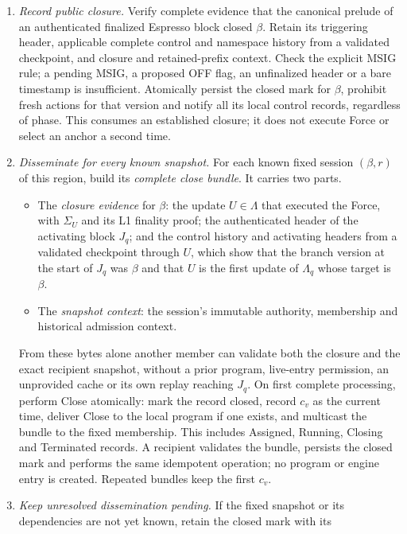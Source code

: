 \documentclass[11pt,a4paper]{article}
\newcommand{\defterm}[1]{\textcolor{rrBlue}{\textit{#1}}}
\begin{document}
\begin{enumerate}[label=(\roman*),itemsep=2pt]
\item \emph{Record public closure.} Verify complete evidence that the
canonical prelude of an authenticated finalized Espresso block closed
$\beta$. Retain its triggering header, applicable complete control and
namespace history from a validated checkpoint, and closure and
retained-prefix context. Check the explicit MSIG rule; a pending
MSIG, a proposed OFF flag, an unfinalized header or a bare timestamp is insufficient.
Atomically persist the closed mark for $\beta$, prohibit fresh actions for
that version and notify all its local control records, regardless of
phase. This consumes an established closure; it does not execute Force
or select an anchor a second time.
\item \emph{Disseminate for every known snapshot.} For each known fixed
session $(\beta,r)$ of this region, build its \defterm{complete close
bundle}. It carries two parts.
 \begin{itemize}
 \item The \emph{closure evidence} for $\beta$: the update $U\in\Lambda$
 that executed the Force, with $\Sigma_U$ and its L1 finality proof; the
 authenticated header of the activating block $J_q$; and the control
 history and activating headers from a validated checkpoint through
 $U$, which show that the branch version at the start of $J_q$ was
 $\beta$ and that $U$ is the first update of $\Lambda_q$ whose target is
 $\beta$.
 \item The \emph{snapshot context}: the session's immutable authority,
 membership and historical admission context.
 \end{itemize}
From these bytes alone another member can validate both the closure and
the exact recipient snapshot, without a prior program, live-entry
permission, an unprovided cache or its own replay reaching $J_q$. On first complete
processing, perform Close atomically: mark the record closed, record
$c_v$ as the current time, deliver Close to the local program if one
exists, and multicast the bundle to the fixed membership. This includes
Assigned, Running, Closing and Terminated records. A recipient validates
the bundle, persists the closed mark and performs the same idempotent operation;
no program or engine entry is created. Repeated bundles keep the first $c_v$.
\item \emph{Keep unresolved dissemination pending.} If the fixed snapshot or
its dependencies are not yet known, retain the closed mark with its

\end{enumerate}
\end{document}
